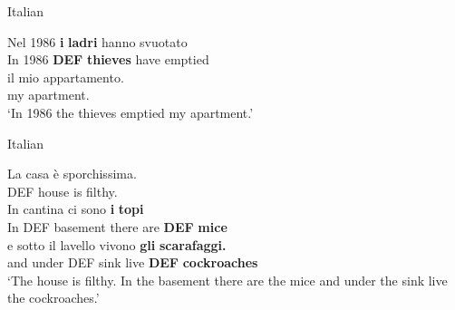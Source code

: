 \z

\item 

\label{bkm:Ref69030716}Italian



 \ea\label{}
\gll Nel  1986  \textbf{i} \textbf{ladri} hanno  svuotato\\


In  1986  \textbf{DEF} \textbf{thieves} have  emptied\\

 \ea\label{}
\gll il mio  appartamento.\\


my  apartment.\\

\glt ‘In 1986 the thieves emptied my apartment.’

\z

\item 

Italian



 \ea\label{}
\gll La  casa  è  sporchissima.\\


DEF  house  is  filthy.\\

 \ea\label{}
\gll In  cantina  ci  sono  \textbf{i} \textbf{topi}\\


In DEF  basement  there  are  \textbf{DEF} \textbf{mice}\\

 \ea\label{}
\gll e  sotto  il  lavello  vivono  \textbf{gli} \textbf{scarafaggi.}\\


and  under  DEF  sink  live  \textbf{DEF} \textbf{cockroaches}\\

\glt ‘The house is filthy. In the basement there are the mice and under the sink live the cockroaches.’  


